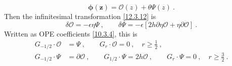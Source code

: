 \begin{equation}
	\bm{\phi}(\bm{z}) = \mathcal{O}(z)+\theta \varPsi(z) \:. \label{12.3.13}
\end{equation}
Then the infinitesimal transformation \eqref{12.3.12} is
\begin{equation}
	\delta \mathcal{O} = -\epsilon\eta\varPsi\:, \qquad 
	\delta \varPsi=-\epsilon[2h\partial\eta \mathcal{O}+\eta\partial\mathcal{O}] \:. \label{12.3.14}
\end{equation}
Written as OPE coefficients \eqref{10.3.4}, this is
\begin{subequations}
	\begin{align}
		G_{{-}1/2}\cdot \mathcal{O} &= \varPsi\:, \qquad G_{r}\cdot \mathcal{O}=0\:, \quad r\geq \tfrac{1}{2} \:,\label{12.3.15a} \\ 
		G_{{-}1/2}\cdot \varPsi &= \partial\mathcal{O}\:, \qquad G_{1/2}\cdot \varPsi = 2h\mathcal{O}\:,
		\qquad G_{r}\cdot\varPsi=0\:,\quad r\geq \tfrac{3}{2} \:. \label{12.3.15b}
	\end{align}\label{12.3.15}
\end{subequations}
